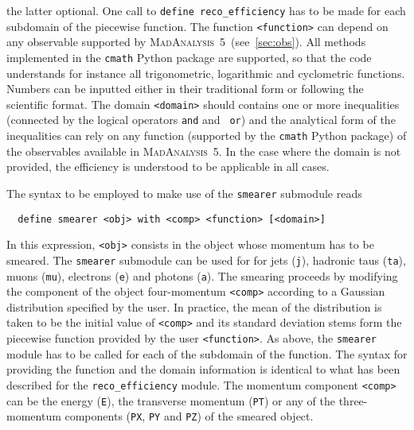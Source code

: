\documentclass[a4paper]{article}
\newcommand{\MA}{\textsc{MadAnalysis}~5}
\begin{document}
the latter optional. One call to {\tt define reco\_efficiency} has to be
made for each subdomain of the piecewise function. The function {\tt <function>}
can depend on any observable supported by \MA\ (see~\autoref{sec:obs}). All
methods implemented in the {\tt cmath} {\sc Python} package are supported, so
that the code understands for instance all trigonometric, logarithmic and
cyclometric functions. Numbers can be inputted either in their traditional form
or following the scientific format. The domain {\tt <domain>} should contains
one or more inequalities (connected by the logical operators {\tt and} and {\tt
or}) and the analytical form of the inequalities can rely on any function
(supported by the {\tt cmath} {\sc Python} package) of the observables available
in \MA. In the case where the domain is not provided, the efficiency is
understood to be applicable in all cases.

\noindent The syntax to be employed to make use of the \verb+smearer+ submodule
reads
{\color{ao} \begin{verbatim}
  define smearer <obj> with <comp> <function> [<domain>]
\end{verbatim}}
\noindent In this expression, \verb+<obj>+ consists in the object whose momentum
has to be smeared. The {\tt smearer} submodule can be used for for jets
(\verb+j+), hadronic taus (\verb+ta+), muons (\verb+mu+), electrons (\verb+e+)
and photons (\verb+a+). The smearing proceeds by modifying the component of the
object four-momentum {\tt <comp>} according to a Gaussian distribution specified
by the user. In practice, the mean of the distribution is taken to be the
initial value of {\tt <comp>} and its standard deviation stems form the
piecewise function provided by the user {\tt <function>}. As above,
the {\tt smearer} module has to be called for each of the subdomain of the
function. The syntax for providing the function and the domain information is
identical to what has been described for the {\tt reco\_efficiency} module. The
momentum component {\tt <comp>} can be the energy (\verb|E|), the transverse
momentum (\verb|PT|) or any of the three-momentum components (\verb+PX+,
\verb+PY+ and \verb+PZ+) of the smeared object.
\end{document}
